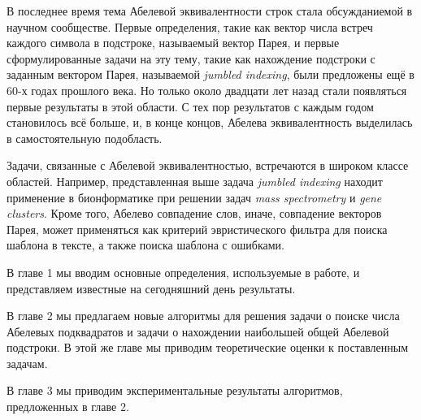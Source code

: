 
В последнее время тема Абелевой эквивалентности строк стала обсужданиемой в научном сообществе.
Первые определения, такие как вектор числа встреч каждого символа в подстроке, называемый вектор Парея,
и первые сформулированные задачи на эту тему, такие как нахождение подстроки
с заданным вектором Парея, называемой \textit{jumbled indexing}, были предложены ещё в 60-х годах прошлого века.
Но только около двадцати лет назад стали появляться первые результаты в этой области.
С тех пор результатов с каждым годом становилось всё больше, и, в конце концов, Абелева эквивалентность выделилась в
самостоятельную подобласть.

Задачи, связанные с Абелевой эквивалентностью, встречаются в широком классе областей.
Например, представленная выше задача \textit{jumbled indexing} находит применение в бионформатике
при решении задач \textit{mass spectrometry} и \textit{gene clusters}.
Кроме того, Абелево совпадение слов, иначе, совпадение векторов Парея,
может применяться как критерий эвристического фильтра для поиска шаблона в тексте,
а также поиска шаблона с ошибками.

В главе 1 мы вводим основные определения, используемые в работе, и представляем
известные на сегодняшний день результаты.

В главе 2 мы предлагаем новые алгоритмы для решения задачи о поиске числа Абелевых подквадратов
и задачи о нахождении наибольшей общей Абелевой подстроки.
В этой же главе мы приводим теоретические оценки к поставленным задачам.

В главе 3 мы приводим экспериментальные результаты алгоритмов, предложенных в главе 2.

